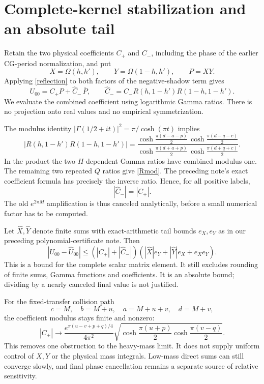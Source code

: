 \documentclass[11pt,a4paper]{article}
\newcommand{\Om}{\Omega}
\begin{document}
\newpage
\section{Complete-kernel stabilization and an absolute tail}
Retain the two physical coefficients $C_+$ and $C_-$, including the
phase of the earlier CG-period normalization, and put
\[
 X=\Om(h,h'),\qquad Y=\Om(1-h,h'),\qquad P=XY.
\]
Applying \eqref{reflection} to both factors of the negative-shadow term gives
\begin{equation}
 U_{00}=C_+P+\widehat C_-\,\overline P,\qquad
 \widehat C_-=C_-R(h,1-h')R(1-h,1-h').
 \label{stable}
\end{equation}
We evaluate the combined coefficient using logarithmic Gamma ratios.
There is no projection onto real values and no empirical symmetrization.

The modulus identity $|\Gamma(1/2+it)|^2=\pi/\cosh(\pi t)$ implies
\begin{equation}
 |R(h,1-h')R(1-h,1-h')|=
 \frac{\cosh\frac{\pi(d-a-p)}2\,\cosh\frac{\pi(d-q-c)}2}
 {\cosh\frac{\pi(d+a+p)}2\,\cosh\frac{\pi(d+q+c)}2}.
 \label{Rmod}
\end{equation}
In the product the two $H$-dependent Gamma ratios have combined
modulus one. The remaining two repeated $Q$ ratios give \eqref{Rmod}.
The preceding note's exact coefficient formula has precisely the
inverse ratio. Hence, for all positive labels,
\begin{equation}
 \boxed{|\widehat C_-|=|C_+|.}
 \label{balance}
\end{equation}
The old $e^{2\pi M}$ amplification is thus canceled analytically,
before a small numerical factor has to be computed.

Let $\widehat X,\widehat Y$ denote finite sums with exact-arithmetic
tail bounds $e_X,e_Y$ as in our preceding polynomial-certificate note.
Then
\begin{equation}
 |U_{00}-\widehat U_{00}|
 \le (|C_+|+|\widehat C_-|)
 (|\widehat X|e_Y+|\widehat Y|e_X+e_Xe_Y).
 \label{error}
\end{equation}
This is a bound for the complete scalar matrix element. It still excludes
rounding of finite sums, Gamma functions and coefficients.
It is an absolute bound; dividing by a nearly canceled final value is
not justified.

For the fixed-transfer collision path
\[
 c=M,\quad b=M+u,\quad a=M+u+v,\quad d=M+v,
\]
the coefficient modulus stays finite and nonzero:
\[
 |C_+|\longrightarrow
 \frac{e^{\pi(u-v+p+q)/4}}{4\pi^2}
 \sqrt{\cosh\frac{\pi(u+p)}2\cosh\frac{\pi(v-q)}2}.
\]
This removes one obstruction to the heavy-mass limit.
It does not supply uniform control of $X,Y$ or the physical mass
integrals. Low-mass direct sums can still converge slowly, and final
phase cancellation remains a separate source of relative sensitivity.
\end{document}
